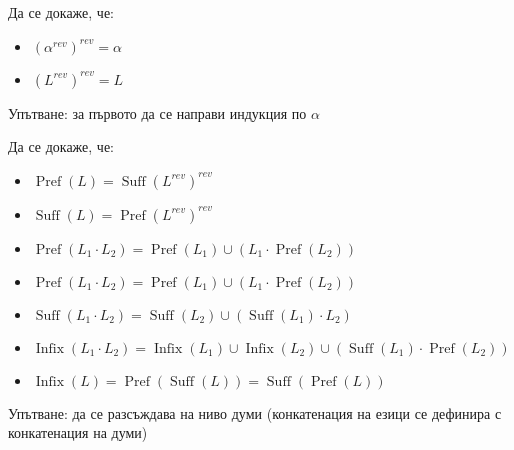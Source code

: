 \begin{problem}
Да се докаже, че:
\begin{itemize}
    \item $(\alpha^{rev})^{rev} = \alpha$
    \item $(L^{rev})^{rev} = L$
\end{itemize}

Упътване: за първото да се направи индукция по $\alpha$
\end{problem}
\begin{problem}
Да се докаже, че:
\begin{itemize}
    \item $\operatorname{Pref}(L) = \operatorname{Suff}(L^{rev})^{rev}$
    \item $\operatorname{Suff}(L) = \operatorname{Pref}(L^{rev})^{rev}$
    \item $\operatorname{Pref}(L_1 \cdot L_2) = \operatorname{Pref}(L_1) \cup (L_1 \cdot \operatorname{Pref}(L_2))$
    \item $\operatorname{Pref}(L_1 \cdot L_2) = \operatorname{Pref}(L_1) \cup (L_1 \cdot \operatorname{Pref}(L_2))$
    \item $\operatorname{Suff}(L_1 \cdot L_2) = \operatorname{Suff}(L_2) \cup (\operatorname{Suff}(L_1) \cdot L_2)$
    \item $\operatorname{Infix}(L_1 \cdot L_2) = \operatorname{Infix}(L_1) \cup \operatorname{Infix}(L_2) \cup (\operatorname{Suff}(L_1) \cdot \operatorname{Pref}(L_2))$
    \item $\operatorname{Infix}(L) = \operatorname{Pref}(\operatorname{Suff}(L)) = \operatorname{Suff}(\operatorname{Pref}(L))$
\end{itemize}

Упътване: да се разсъждава на ниво думи (конкатенация на езици се дефинира с конкатенация на думи)
\end{problem}